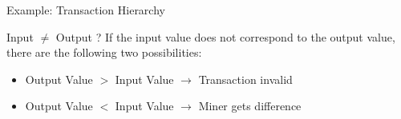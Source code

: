 \documentclass[handout]{beamer}
\begin{document}
\begin{frame}{Example: Transaction Hierarchy}
\resizebox{\textwidth}{!}{

}
\end{frame}


\begin{frame}{Input $\neq$ Output ?}
If the input value does not correspond to the output value, there are the following two possibilities:
\vspace{1em}
\begin{itemize}
    \item<1->{Output Value $>$ Input Value $\rightarrow$ Transaction invalid}
    \item<2->{Output Value $<$ Input Value $\rightarrow$ Miner gets difference}
    \end{itemize} 
    \vspace{1.5em}
\end{frame}
\end{document}
